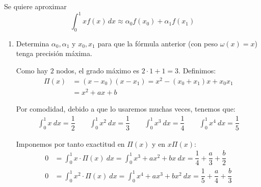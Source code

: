 \documentclass[12pt]{article}
\author{Arturo Olivares Martos}
\date{\today}
\begin{document}
    {\color{blue}

    \renewcommand{\headrulewidth}{1pt}
    \renewcommand{\headrule}{\hbox to\headwidth{%
    \color{blue}\leaders\hrule height \headrulewidth\hfill}}
    
    \begin{ejercicio}
        Se quiere aproximar
        \begin{equation*}
            \int_0^1 xf(x) \, dx\approx \alpha_0 f(x_0) + \alpha_1 f(x_1)
        \end{equation*}
        \begin{enumerate}
            \item Determina $\alpha_0, \alpha_1$ y $x_0, x_1$ para que la fórmula anterior (con peso $\omega(x)=x$) tenga precisión máxima.
            
            Como hay $2$ nodos, el grado máximo es $2\cdot 1+1=3$.
            Definimos:
            \begin{align*}
                \Pi(x) &= (x-x_0)(x-x_1) = x^2 - (x_0+x_1)x + x_0x_1\\
                &= x^2+ax+b
            \end{align*}

            Por comodidad, debido a que lo usaremos muchas veces, tenemos que:
            \begin{align*}
                \int_0^1 x\ dx = \dfrac{1}{2}\qquad 
                \int_0^1 x^2\ dx = \dfrac{1}{3}\qquad
                \int_0^1 x^3\ dx = \dfrac{1}{4}\qquad
                \int_0^1 x^4\ dx = \dfrac{1}{5}
            \end{align*}

            Imponemos por tanto exactitud en $\Pi(x)$ y en $x\Pi(x)$:
            \begin{align*}
                0 &= \int_0^1 x\cdot \Pi(x)\ dx = \int_0^1 x^3 + ax^2 + bx\ dx
                = \dfrac{1}{4} + \dfrac{a}{3} + \dfrac{b}{2}\\
                0 &= \int_0^1 x^2\cdot \Pi(x)\ dx = \int_0^1 x^4 + ax^3 + bx^2\ dx
                = \dfrac{1}{5} + \dfrac{a}{4} + \dfrac{b}{3}
            \end{align*}


\end{enumerate}
\end{ejercicio}}
\end{document}
